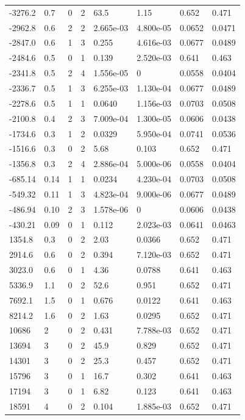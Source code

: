\documentclass[preview]{standalone}
\begin{document}
{{\begin{tabular}{L{1.2cm}C{1.2cm} C{0.3cm}C{0.5cm} C{1.4cm}C{1.4cm} C{1.4cm}C{1.4cm}}
  -3276.2  &   0.7  & 0     &  2 &  63.5  & 1.15  & 0.652 &  0.471   \\ 
  -2962.8  &   0.6  & 2     &  2 &  2.665e-03  & 4.800e-05  & 0.0652 &  0.0471   \\ 
  -2847.0  &   0.6  & 1     &  3 &  0.255  & 4.616e-03  & 0.0677 &  0.0489   \\ 
  -2484.6  &   0.5  & 0     &  1 &  0.139  & 2.520e-03  & 0.641 &  0.463   \\ 
  -2341.8  &   0.5  & 2     &  4 &  1.556e-05  & 0  & 0.0558 &  0.0404   \\ 
  -2336.7  &   0.5  & 1     &  3 &  6.255e-03  & 1.130e-04  & 0.0677 &  0.0489   \\ 
  -2278.6  &   0.5  & 1     &  1 &  0.0640  & 1.156e-03  & 0.0703 &  0.0508   \\ 
  -2100.8  &   0.4  & 2     &  3 &  7.009e-04  & 1.300e-05  & 0.0606 &  0.0438   \\ 
  -1734.6  &   0.3  & 1     &  2 &  0.0329  & 5.950e-04  & 0.0741 &  0.0536   \\ 
  -1516.6  &   0.3  & 0     &  2 &  5.68  & 0.103  & 0.652 &  0.471   \\ 
  -1356.8  &   0.3  & 2     &  4 &  2.886e-04  & 5.000e-06  & 0.0558 &  0.0404   \\ 
  -685.14  &  0.14  & 1     &  1 &  0.0234  & 4.230e-04  & 0.0703 &  0.0508   \\ 
  -549.32  &  0.11  & 1     &  3 &  4.823e-04  & 9.000e-06  & 0.0677 &  0.0489   \\ 
  -486.94  &  0.10  & 2     &  3 &  1.578e-06  & 0  & 0.0606 &  0.0438   \\ 
  -430.21  &  0.09  & 0     &  1 &  0.112  & 2.023e-03  & 0.0641 &  0.0463   \\ 
  1354.8  &   0.3  & 0     &  2 &  2.03  & 0.0366  & 0.652 &  0.471   \\ 
  2914.6  &   0.6  & 0     &  2 &  0.394  & 7.120e-03  & 0.652 &  0.471   \\ 
  3023.0  &   0.6  & 0     &  1 &  4.36  & 0.0788  & 0.641 &  0.463   \\ 
  5336.9  &   1.1  & 0     &  2 &  52.6  & 0.951  & 0.652 &  0.471   \\ 
  7692.1  &   1.5  & 0     &  1 &  0.676  & 0.0122  & 0.641 &  0.463   \\ 
  8214.2  &   1.6  & 0     &  2 &  1.63  & 0.0295  & 0.652 &  0.471   \\ 
  10686  &     2  & 0     &  2 &  0.431  & 7.788e-03  & 0.652 &  0.471   \\ 
  13694  &     3  & 0     &  2 &  45.9  & 0.829  & 0.652 &  0.471   \\ 
  14301  &     3  & 0     &  2 &  25.3  & 0.457  & 0.652 &  0.471   \\ 
  15796  &     3  & 0     &  1 &  16.7  & 0.302  & 0.641 &  0.463   \\ 
  17194  &     3  & 0     &  1 &  6.82  & 0.123  & 0.641 &  0.463   \\ 
  18591  &     4  & 0     &  2 &  0.104  & 1.885e-03  & 0.652 &  0.471   \\ 
\hline 
\end{tabular} 

}}
\end{document}

